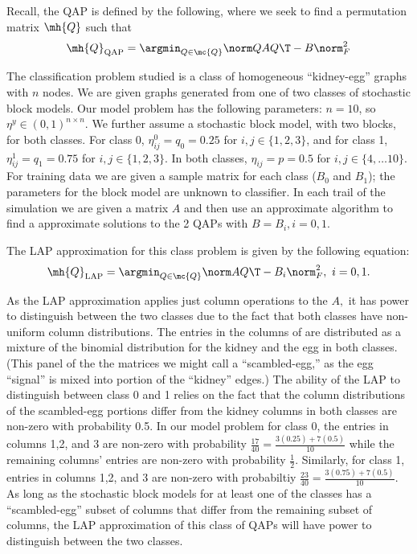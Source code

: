  
 Recall, the QAP is defined by the following, where we seek to 
 find a permutation matrix $\mh{Q}$ such that
 \begin{align} \label{eq:QAP}
	\mh{Q}_{\text{QAP}} = \argmin_{Q \in \mc{Q}} \norm Q A Q\T - B \norm ^2_F
\end{align}

 
 The classification problem studied is a class of  homogeneous 
 ``kidney-egg'' graphs with $n$ nodes.  
We are given graphs generated from one of two classes of
 stochastic block models.    Our model problem has the following parameters: $n=10$, so $\eta^y \in (0,1)^{n\times n}$.  We further assume a stochastic block model, with two blocks, for both classes.  For class 0, $\eta_{ij}^0=q_0=0.25$ for $i,j \in \{1,2,3\}$, and for class 1, $\eta_{ij}^1=q_1=0.75$ for $i,j \in \{1,2,3\}$.  In both classes, $\eta_{ij}=p=0.5$ for $i,j \in \{4,\ldots 10\}$.   For  training data we are given a sample matrix for
 each class ($B_{0}$ and $B_{1}$); the parameters for the block model are
 unknown to classifier.    In each trail of the simulation we are given a matrix
 $A$ and then use an approximate algorithm to find a 
approximate solutions to the 2 QAPs with $B=B_{i}, i=0,1.$ 


The LAP approximation  for this class problem is given by the following equation:
\begin{align} \label{eq:LAP}
	\mh{Q}_{\text{LAP}} = \argmin_{Q \in \mc{Q}} \norm A Q\T - B_{i} \norm ^2_F,~i=0,1.
\end{align}

As the LAP approximation applies just column operations
to the $A,$   it has power to distinguish between the two classes
due to the fact that both classes have non-uniform column distributions.
The entries in the columns of are distributed as a mixture of the
binomial distribution for the kidney and the egg in both classes. 
(This panel of the the matrices we might call a ``scambled-egg,'' as the
egg ``signal'' is mixed into portion of the ``kidney'' edges.)
 The ability of the LAP to distinguish between class 0 and 1 relies
 on the fact that the column distributions of the 
 scambled-egg portions differ from the kidney columns in both classes are
 non-zero with probability 0.5.  
In our model problem for class 0, the entries in columns 1,2, and 3 are non-zero
with probability $\frac{17}{40}=\frac {3(0.25)+7(0.5)}{10}$ 
while the remaining columns' entries
are non-zero with probability $\frac{1}{2}.$  Similarly, for class 1, entries in
columns 1,2, and 3   are non-zero with probabiltiy
$\frac{23}{40}=\frac{3(0.75)+7(0.5)}{10}.$  As long as the stochastic block
models for at least one of the classes has a ``scambled-egg'' subset of
columns that differ from the remaining subset of columns, the LAP approximation
of this class of QAPs will have power to distinguish between the two classes.


